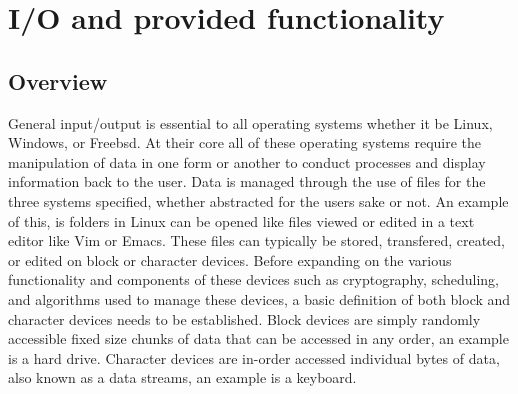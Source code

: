 \section{I/O and provided functionality}
\subsection{Overview}
General input/output is essential to all operating systems whether it be Linux, Windows, or Freebsd. At their core all of these operating systems require the manipulation of data in one form or another to conduct processes and display information back to the user. Data is managed through the use of files for the three systems specified, whether abstracted for the users sake or not. An example of this, is folders in Linux can be opened like files viewed or edited in a text editor like Vim or Emacs. These files can typically be stored, transfered, created, or edited on block or character devices. Before expanding on the various functionality and components of these devices such as cryptography, scheduling, and algorithms used to manage these devices, a basic definition of both block and character devices needs to be established. Block devices are simply randomly accessible fixed size chunks of data that can be accessed in any order, an example is a hard drive. Character devices are in-order accessed individual bytes of data, also known as a data streams, an example is a keyboard\cite{Linux_book}.
